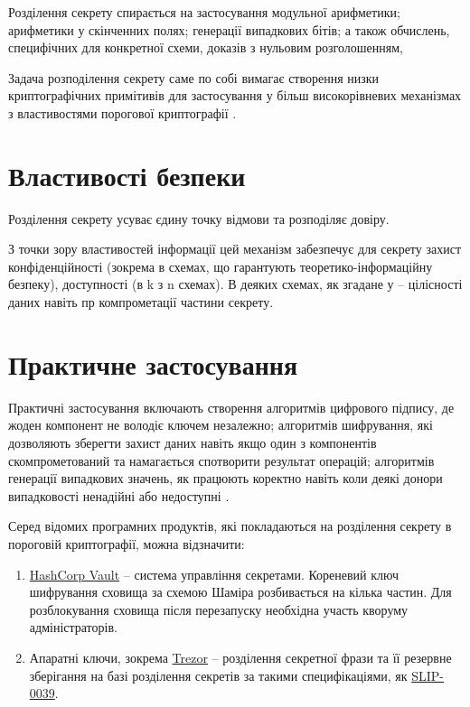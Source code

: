 \documentclass{kpi-lab}
\begin{document}
Розділення секрету спирається на застосування модульної арифметики;
арифметики у скінченних полях;
генерації випадкових бітів;
а також обчислень, специфічних для конкретної схеми,
доказів з нульовим розголошенням,

Задача розподілення секрету саме по собі вимагає створення
низки криптографічних примітивів для застосування у більш
високорівневих механізмах з властивостями порогової
криптографії \cite{nist-ir-8214}.

\section{Властивості безпеки}

Розділення секрету усуває єдину точку відмови та розподіляє довіру.

З точки зору властивостей інформації цей механізм
забезпечує для секрету захист конфіденційності (зокрема в
схемах, що гарантують теоретико-інформаційну безпеку),
доступності (в k з n схемах). В деяких схемах, як згадане у
\cite[][\pagename iv]{nist-ir-8214} -- цілісності даних
навіть пр компрометації частини секрету.

\section{Практичне застосування}

Практичні застосування включають створення
алгоритмів цифрового підпису, де жоден компонент не володіє
ключем незалежно;
алгоритмів шифрування, які дозволяють зберегти захист даних
навіть якщо один з компонентів скомпрометований та
намагається спотворити результат операцій;
алгоритмів генерації випадкових значень, як працюють
коректно навіть коли деякі донори випадковості ненадійні
або недоступні \cite{nist-ir-8214}.

Серед відомих програмних продуктів, які покладаються на
розділення секрету в пороговій криптографії, можна відзначити:
\begin{enumerate}
  \item
    \href{https://developer.hashicorp.com/vault/docs/concepts/seal}
    {HashCorp Vault}
    -- система управління секретами.
    Кореневий ключ шифрування сховища за схемою Шаміра
    розбивається на кілька частин.
    Для розблокування сховища після перезапуску необхідна
    участь кворуму адміністраторів.
  \item Апаратні ключи, зокрема
    \href{https://trezor.io/trezor-safe-7}{Trezor}
    -- розділення секретної фрази та її резервне зберігання
    на базі розділення секретів за такими специфікаціями,
    як
    \href{https://slips.readthedocs.io/en/latest/slip-0039/}{SLIP-0039}.
\end{enumerate}
\end{document}
